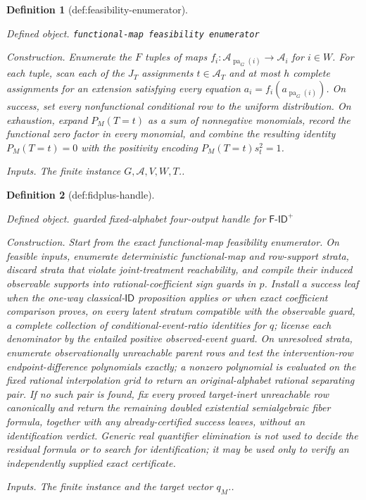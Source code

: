 \documentclass{article}
\newtheorem{definition}{Definition}
\begin{document}
\begin{definition}[def:feasibility-enumerator]\label{def:feasibility-enumerator}
\par\smallskip\noindent\emph{Defined object.} \texttt{functional-\allowbreak{}map feasibility enumerator}
\par\smallskip\noindent\emph{Construction.} Enumerate the \(F\) tuples of maps \(f_i:\mathcal A_{\operatorname{pa}_G(i)}\to\mathcal A_i\) for \(i\in W\). For each tuple, scan each of the \(J_T\) assignments \(t\in\mathcal A_T\) and at most \(h\) complete assignments for an extension satisfying every equation \(a_i=f_i(a_{\operatorname{pa}_G(i)})\). On success, set every nonfunctional conditional row to the uniform distribution. On exhaustion, expand \(P_M(T=t)\) as a sum of nonnegative monomials, record the functional zero factor in every monomial, and combine the resulting identity \(P_M(T=t)=0\) with the positivity encoding \(P_M(T=t)s_t^2=1\).
\par\smallskip\noindent\emph{Inputs.} The finite instance \(G,\mathcal A,V,W,T\)..
\end{definition}

\begin{definition}[def:fidplus-handle]\label{def:fidplus-handle}
\par\smallskip\noindent\emph{Defined object.} guarded fixed-alphabet four-output handle for \(\mathsf{F\text{-}ID}^{+}\)
\par\smallskip\noindent\emph{Construction.} Start from the exact functional-map feasibility enumerator. On feasible inputs, enumerate deterministic functional-map and row-support strata, discard strata that violate joint-treatment reachability, and compile their induced observable supports into rational-coefficient sign guards in \(p\). Install a success leaf when the one-way classical-\(\mathsf{ID}\) proposition applies or when exact coefficient comparison proves, on every latent stratum compatible with the observable guard, a complete collection of conditional-event-ratio identities for \(q\); license each denominator by the entailed positive observed-event guard. On unresolved strata, enumerate observationally unreachable parent rows and test the intervention-row endpoint-difference polynomials exactly; a nonzero polynomial is evaluated on the fixed rational interpolation grid to return an original-alphabet rational separating pair. If no such pair is found, fix every proved target-inert unreachable row canonically and return the remaining doubled existential semialgebraic fiber formula, together with any already-certified success leaves, without an identification verdict. Generic real quantifier elimination is not used to decide the residual formula or to search for identification; it may be used only to verify an independently supplied exact certificate.
\par\smallskip\noindent\emph{Inputs.} The finite instance and the target vector \(q_M\)..
\end{definition}
\end{document}
